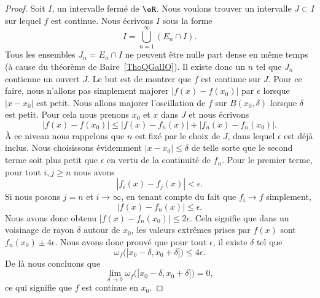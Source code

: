 \begin{proof}
	Soit \( I\), un intervalle fermé de \( \eR\). Nous voulons trouver un intervalle \( J\subset I\) sur lequel \( f\) est continue. Nous écrivons \( I\) sous la forme
	\begin{equation}
		I=\bigcup_{n=1}^{\infty}(E_n\cap I).
	\end{equation}
	Tous les ensembles \( J_n=E_n\cap I\) ne peuvent être nulle part dense en même temps (à cause du théorème de Baire~\ref{ThoQGalIO}). Il existe donc un \( n\) tel que \( J_n\) contienne un ouvert \( J\). Le but est de montrer que \( f\) est continue sur \( J\). Pour ce faire, nous n'allons pas simplement majorer \( | f(x)-f(x_0) |\) par \( \epsilon\) lorsque \( | x-x_0 |\) est petit. Nous allons majorer l'oscillation de \( f\) sur \( B(x_0,\delta)\) lorsque \( \delta\) est petit. Pour cela nous prenons \( x_0\) et \( x\) dans \( J\) et nous écrivons
	\begin{equation}
		| f(x)-f(x_0) |\leq | f(x)-f_n(x) |+| f_n(x)-f_n(x_0) |.
	\end{equation}
	À ce niveau nous rappelons que \( n\) est fixé par le choix de \( J\), dans lequel \( \epsilon\) est déjà inclus. Nous choisissons évidemment \( | x-x_0 |\leq \delta\) de telle sorte que le second terme soit plus petit que \( \epsilon\) en vertu de la continuité de \( f_n\). Pour le premier terme, pour tout \( i,j\geq n\) nous avons
	\begin{equation}
		| f_i(x)-f_j(x) |<\epsilon.
	\end{equation}
	Si nous posons \( j=n\) et \( i\to\infty\), en tenant compte du fait que \( f_i\to f\) simplement,
	\begin{equation}
		| f(x)-f_n(x) |\leq \epsilon.
	\end{equation}
	Nous avons donc obtenu \( | f(x)-f_n(x_0) |\leq 2\epsilon\). Cela signifie que dans un voisinage de rayon \( \delta\) autour de \( x_0\), les valeurs extrêmes prises par \( f(x) \) sont \( f_n(x_0)\pm 4\epsilon\). Nous avons donc prouvé que pour tout \( \epsilon\), il existe \( \delta\) tel que
	\begin{equation}
		\omega_f\big( \mathopen[ x_0-\delta , x_0+\delta \mathclose] \big)\leq 4\epsilon.
	\end{equation}
	De là nous concluons que
	\begin{equation}
		\lim_{\delta\to 0}\omega_f\big( \mathopen[ x_0-\delta , x_0+\delta \mathclose] \big)=0,
	\end{equation}
	ce qui signifie que \( f\) est continue en \( x_0\).
\end{proof}

